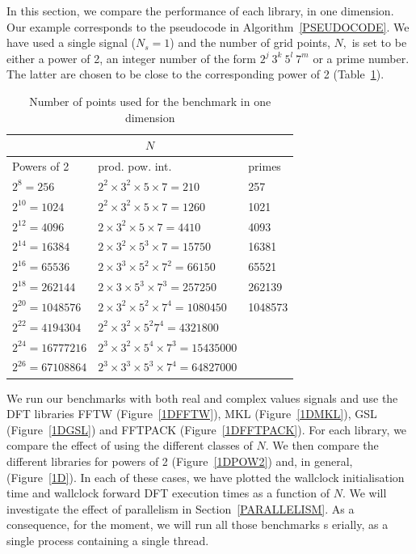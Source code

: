 \documentclass[12pt, a4paper]{article}
\begin{document}
In this section, we compare the performance of each library, in one dimension. 
Our example corresponds to the pseudocode in Algorithm~\ref{PSEUDOCODE}. We have 
used a single signal ($N_s=1$) and the number of grid points, $N,$ is set to be either a power of 2, 
an integer number of the form $2^j\ 3^k\ 5^l\ 7^m$ or a prime number. The latter are chosen to be 
close to the corresponding power of 2 (Table~\ref{SIZES1D}).
\begin{table}[H]
\captionsetup{width=0.8\linewidth}
\centering
\begin{tabular}{|l|l|l|}
  \hline
  \multicolumn{3}{|c|}{$N$}\\
  \hline
  \hline
Powers of 2 & prod. pow. int. & primes\\ \hline
$2^8=256$	 & $2^2\times 3^2\times 5\times 7=210$	     & 257  \\ \hline
$2^{10}=1024$	 & $2^2\times 3^2\times 5\times 7=1260$	     & 1021  \\ \hline
$2^{12}=4096$	 & $2\times 3^2\times 5\times 7=4410$	     & 4093 \\ \hline
$2^{14}=16384$	 & $2\times 3^2\times 5^3\times 7=15750$	     & 16381 \\ \hline
$2^{16}=65536$	 & $2\times 3^3\times 5^2\times 7^2=66150$      & 65521 \\ \hline
$2^{18}=262144$	 & $2\times 3\times 5^3\times 7^3=257250$       & 262139 \\ \hline
$2^{20}=1048576$  & $2\times 3^2\times 5^2\times 7^4=1080450$    & 1048573 \\ \hline
$2^{22}=4194304$  & $2^2\times 3^2\times 5^2 7^4=4321800$  &	\\ \hline
$2^{24}=16777216$ & $2^3\times 3^2\times 5^4\times 7^3=15435000$ &	\\ \hline
$2^{26}=67108864$ & $2^3\times 3^3\times 5^3\times 7^4=64827000$ &\\ \hline
\end{tabular}
\caption{Number of points used for the benchmark in one dimension}\label{SIZES1D}
\end{table}


 We run our benchmarks with both real and complex values signals and use the DFT libraries 
FFTW (Figure~\ref{1DFFTW}), MKL (Figure~\ref{1DMKL}), GSL (Figure~\ref{1DGSL}) and FFTPACK 
(Figure~\ref{1DFFTPACK}). For each library, we compare the effect of using the different 
classes of $N.$ We then compare the different libraries for powers of 2 (Figure~\ref{1DPOW2}) and, 
in general, (Figure~\ref{1D}). In each of these cases, we have plotted the wallclock initialisation time and 
wallclock forward DFT execution times as a function of $N.$ We will investigate the effect of parallelism in 
Section~\ref{PARALLELISM}. As a consequence, for the moment, we will run all those benchmarks s
erially, as a single process containing a single thread.
\end{document}
